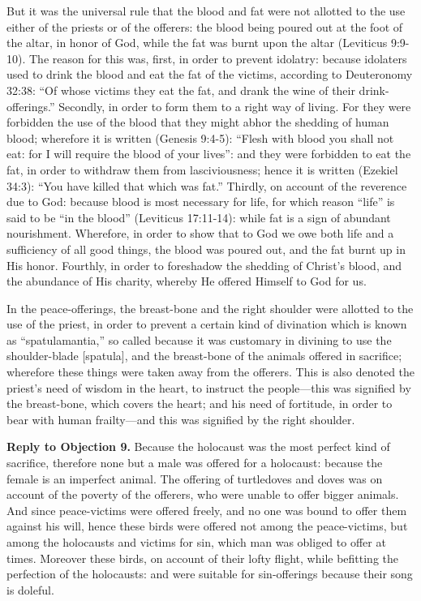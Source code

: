 But it was the universal rule that the blood and fat were not allotted to the use either of the priests or of the offerers: the blood being poured out at the foot of the altar, in honor of God, while the fat was burnt upon the altar (Leviticus 9:9-10). The reason for this was, first, in order to prevent idolatry: because idolaters used to drink the blood and eat the fat of the victims, according to Deuteronomy 32:38: ``Of whose victims they eat the fat, and drank the wine of their drink-offerings.'' Secondly, in order to form them to a right way of living. For they were forbidden the use of the blood that they might abhor the shedding of human blood; wherefore it is written (Genesis 9:4-5): ``Flesh with blood you shall not eat: for I will require the blood of your lives'': and they were forbidden to eat the fat, in order to withdraw them from lasciviousness; hence it is written (Ezekiel 34:3): ``You have killed that which was fat.'' Thirdly, on account of the reverence due to God: because blood is most necessary for life, for which reason ``life'' is said to be ``in the blood'' (Leviticus 17:11-14): while fat is a sign of abundant nourishment. Wherefore, in order to show that to God we owe both life and a sufficiency of all good things, the blood was poured out, and the fat burnt up in His honor. Fourthly, in order to foreshadow the shedding of Christ's blood, and the abundance of His charity, whereby He offered Himself to God for us.

In the peace-offerings, the breast-bone and the right shoulder were allotted to the use of the priest, in order to prevent a certain kind of divination which is known as ``spatulamantia,'' so called because it was customary in divining to use the shoulder-blade [spatula], and the breast-bone of the animals offered in sacrifice; wherefore these things were taken away from the offerers. This is also denoted the priest's need of wisdom in the heart, to instruct the people—this was signified by the breast-bone, which covers the heart; and his need of fortitude, in order to bear with human frailty—and this was signified by the right shoulder.

\textbf{Reply to Objection 9.} Because the holocaust was the most perfect kind of sacrifice, therefore none but a male was offered for a holocaust: because the female is an imperfect animal. The offering of turtledoves and doves was on account of the poverty of the offerers, who were unable to offer bigger animals. And since peace-victims were offered freely, and no one was bound to offer them against his will, hence these birds were offered not among the peace-victims, but among the holocausts and victims for sin, which man was obliged to offer at times. Moreover these birds, on account of their lofty flight, while befitting the perfection of the holocausts: and were suitable for sin-offerings because their song is doleful.

